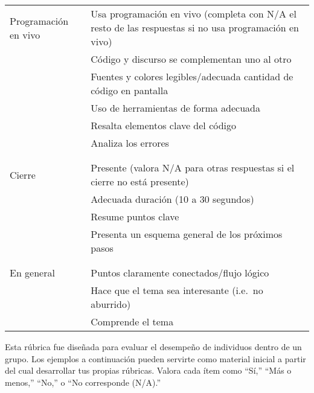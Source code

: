 \begin{longtable}{p{}p{}}
  Programación en vivo
  & Usa programación en vivo (completa con N/A el resto de las respuestas si no usa programación en vivo) \\
  & Código y discurso se complementan uno al otro\\
  & Fuentes y colores legibles/adecuada cantidad de código en pantalla \\
  & Uso de herramientas de forma adecuada \\
  & Resalta elementos clave del código \\
  & Analiza los errores \\
  \\ [-1.5ex] \hline \\ [-1.5ex]

  Cierre
  & Presente (valora N/A para otras respuestas si el cierre no está presente) \\
  & Adecuada duración (10 a 30 segundos) \\
  & Resume puntos clave \\
  & Presenta un esquema general de los próximos pasos \\
  \\ [-1.5ex] \hline \\ [-1.5ex]

  En general
  & Puntos claramente conectados/flujo lógico \\
  & Hace que el tema sea interesante (i.e.\ no aburrido) \\
  & Comprende el tema \\

\end{longtable}


Esta rúbrica fue diseñada para evaluar el desempeño de individuos dentro de un grupo. 
Los ejemplos a continuación pueden servirte como material inicial a partir del cual desarrollar tus propias rúbricas. 
Valora cada ítem como ``Sí,'' ``Más o menos,'' ``No,'' o ``No corresponde (N/A).''

